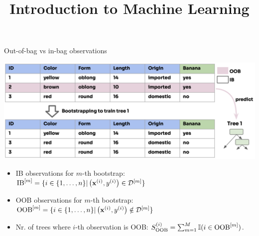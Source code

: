 \documentclass[11pt,compress,t,notes=noshow,xcolor=table]{beamer}
\title{Introduction to Machine Learning}
\begin{document}

\begin{vbframe}{Out-of-bag vs in-bag observations}

\begin{center}
\includegraphics[width=\textwidth]{figure_man/forest-oob.png}
\end{center}

\begin{itemize}
\item IB observations for $m$-th bootstrap: $\text{IB}^{[m]} = \{i \in \{1, \ldots, n\} | \left(\mathbf{x}^{(i)}, y^{(i)}\right) \in \mathcal{D}^{[m]}  \} $
\item OOB observations for $m$-th bootstrap: $\text{OOB}^{[m]} = \{i \in \{1, \ldots, n\} | \left(\mathbf{x}^{(i)}, y^{(i)}\right) \notin \mathcal{D}^{[m]}  \} $
  \item Nr. of trees where $i$-th observation is OOB: $S_{\text{OOB}}^{(i)} = \sum_{m = 1}^M \mathbb{I}(i \in \text{OOB}^{[m]})$.
\end{itemize}

\end{vbframe}
\end{document}
